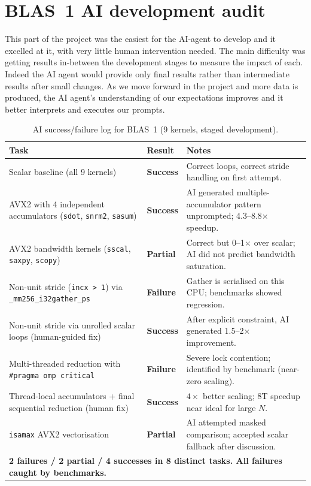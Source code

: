 \documentclass[11pt,a4paper]{article}
\begin{document}
\section{BLAS~1 AI development audit}
This part of the project was the easiest for the AI-agent to develop and it excelled at it, with very little human intervention needed. The main difficulty was getting results in-between the development stages to measure the impact of each. Indeed the AI agent would provide only final results rather than intermediate results after small changes. As we move forward in the project and more data is produced, the AI agent's understanding of our expectations improves and it better interprets and executes our prompts.
\begin{table}[h]
\centering
\caption{AI success/failure log for BLAS~1 (9 kernels, staged development).}
\label{tab:blas1_ai_audit}
\small
\begin{tabular}{p{4.5cm}p{2cm}p{7cm}}
\toprule
Task & Result & Notes \\
\midrule
Scalar baseline (all 9 kernels)
  & \textbf{Success}
  & Correct loops, correct stride handling on first attempt. \\
AVX2 with 4 independent accumulators (\texttt{sdot}, \texttt{snrm2}, \texttt{sasum})
  & \textbf{Success}
  & AI generated multiple-accumulator pattern unprompted; 4.3--8.8$\times$ speedup. \\
AVX2 bandwidth kernels (\texttt{sscal}, \texttt{saxpy}, \texttt{scopy})
  & \textbf{Partial}
  & Correct but 0--1$\times$ over scalar; AI did not predict bandwidth saturation. \\
Non-unit stride (\texttt{incx > 1}) via \texttt{\_mm256\_i32gather\_ps}
  & \textbf{\color{red}Failure}
  & Gather is serialised on this CPU; benchmarks showed regression. \\
Non-unit stride via unrolled scalar loops (human-guided fix)
  & \textbf{Success}
  & After explicit constraint, AI generated 1.5--2$\times$ improvement. \\
Multi-threaded reduction with \texttt{\#pragma omp critical}
  & \textbf{\color{red}Failure}
  & Severe lock contention; identified by benchmark (near-zero scaling). \\
Thread-local accumulators + final sequential reduction (human fix)
  & \textbf{Success}
  & $4\times$ better scaling; 8T speedup near ideal for large $N$. \\
\texttt{isamax} AVX2 vectorisation
  & \textbf{Partial}
  & AI attempted masked comparison; accepted scalar fallback after discussion. \\
\midrule
\multicolumn{3}{l}{\textbf{2 failures / 2 partial / 4 successes in 8 distinct tasks. All failures caught by benchmarks.}} \\
\bottomrule
\end{tabular}
\end{table}
\end{document}
